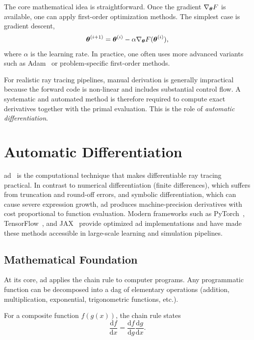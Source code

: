 The core mathematical idea is straightforward. Once the gradient $\nabla_{\boldsymbol{\theta}}F$ is available, one can apply first-order optimization methods. The simplest case is gradient descent,
\begin{equation}
  \boldsymbol{\theta}^{(i+1)} = \boldsymbol{\theta}^{(i)} - \alpha \nabla_{\boldsymbol{\theta}} F(\boldsymbol{\theta}^{(i)}),
\end{equation}
where $\alpha$ is the learning rate. In practice, one often uses more advanced variants such as Adam~ or problem-specific first-order methods.

For realistic ray tracing pipelines, manual derivation is generally impractical because the forward code is non-linear and includes substantial control flow. A systematic and automated method is therefore required to compute exact derivatives together with the primal evaluation. This is the role of \emph{automatic differentiation}.

\section{Automatic Differentiation}

\Gls{ad}~ is the computational technique that makes differentiable ray tracing practical. In contrast to numerical differentiation (finite differences), which suffers from truncation and round-off errors, and symbolic differentiation, which can cause severe expression growth, \gls{ad} produces machine-precision derivatives with cost proportional to function evaluation. Modern frameworks such as PyTorch~, TensorFlow~, and JAX~ provide optimized \gls{ad} implementations and have made these methods accessible in large-scale learning and simulation pipelines.

\subsection{Mathematical Foundation}

At its core, \gls{ad} applies the chain rule to computer programs. Any programmatic function can be decomposed into a \gls{dag} of elementary operations (addition, multiplication, exponential, trigonometric functions, etc.).

For a composite function $f(g(x))$, the chain rule states
\begin{equation}
  \frac{\mathrm{d}f}{\mathrm{d}x} = \frac{\mathrm{d}f}{\mathrm{d}g} \frac{\mathrm{d}g}{\mathrm{d}x}.
\end{equation}

